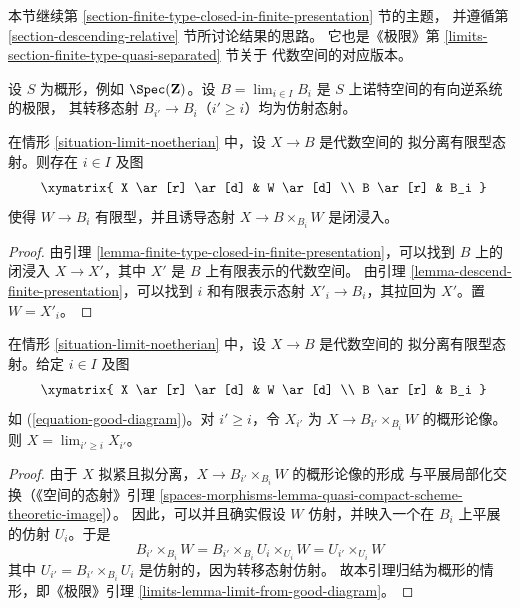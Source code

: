 \noindent
本节继续第 \ref{section-finite-type-closed-in-finite-presentation} 节的主题，
并遵循第 \ref{section-descending-relative} 节所讨论结果的思路。
它也是《极限》第 \ref{limits-section-finite-type-quasi-separated} 节关于
代数空间的对应版本。

\begin{situation}
\label{situation-limit-noetherian}
设 $S$ 为概形，例如 $\Spec(\mathbf{Z})$。设
$B = \lim_{i \in I} B_i$ 是 $S$ 上诺特空间的有向逆系统的极限，
其转移态射 $B_{i'} \to B_i$（$i' \geq i$）均为仿射态射。
\end{situation}

\begin{lemma}
\label{lemma-good-diagram}
在情形 \ref{situation-limit-noetherian} 中，设 $X \to B$ 是代数空间的
拟分离有限型态射。则存在 $i \in I$ 及图
\begin{equation}
\label{equation-good-diagram}
\vcenter{
\xymatrix{
X \ar[r] \ar[d] & W \ar[d] \\
B \ar[r] & B_i
}
}
\end{equation}
使得 $W \to B_i$ 有限型，并且诱导态射
$X \to B \times_{B_i} W$ 是闭浸入。
\end{lemma}

\begin{proof}
由引理 \ref{lemma-finite-type-closed-in-finite-presentation}，可以找到
$B$ 上的闭浸入 $X \to X'$，其中 $X'$ 是 $B$ 上有限表示的代数空间。
由引理 \ref{lemma-descend-finite-presentation}，可以找到 $i$ 和有限表示态射
$X'_i \to B_i$，其拉回为 $X'$。置 $W = X'_i$。
\end{proof}

\begin{lemma}
\label{lemma-limit-from-good-diagram}
在情形 \ref{situation-limit-noetherian} 中，设 $X \to B$ 是代数空间的
拟分离有限型态射。给定 $i \in I$ 及图
$$
\vcenter{
\xymatrix{
X \ar[r] \ar[d] & W \ar[d] \\
B \ar[r] & B_i
}
}
$$
如 (\ref{equation-good-diagram})。对 $i' \geq i$，令 $X_{i'}$ 为
$X \to B_{i'} \times_{B_i} W$ 的概形论像。则
$X = \lim_{i' \geq i} X_{i'}$。
\end{lemma}

\begin{proof}
由于 $X$ 拟紧且拟分离，$X \to B_{i'} \times_{B_i} W$ 的概形论像的形成
与平展局部化交换（《空间的态射》引理
\ref{spaces-morphisms-lemma-quasi-compact-scheme-theoretic-image}）。
因此，可以并且确实假设 $W$ 仿射，并映入一个在 $B_i$ 上平展的仿射
$U_i$。于是
$$
B_{i'} \times_{B_i} W =
B_{i'} \times_{B_i} U_i \times_{U_i} W =
U_{i'} \times_{U_i} W
$$
其中 $U_{i'} = B_{i'} \times_{B_i} U_i$ 是仿射的，因为转移态射仿射。
故本引理归结为概形的情形，即《极限》引理
\ref{limits-lemma-limit-from-good-diagram}。
\end{proof}

